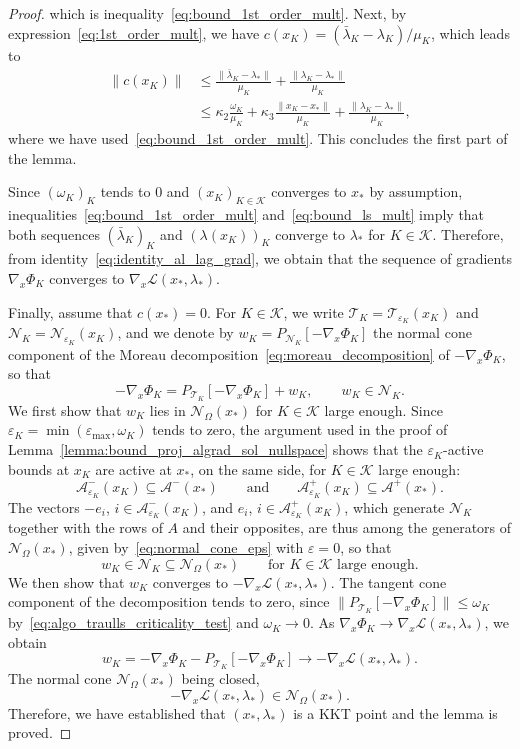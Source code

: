 \documentclass{article}
\numberwithin{equation}{section}
\newcommand{\calA}{{\mathcal{A}}}
\newcommand{\calL}{{\mathcal{L}}}
\newcommand{\calK}{{\mathcal{K}}}
\newcommand{\calN}{{\mathcal{N}}}
\newcommand{\calT}{{\mathcal{T}}}
\newcommand{\proj}[2]{P_{#1} \left[ {#2} \right]} %
\theoremstyle{plain}
\begin{document}
\begin{proof}
		which is inequality~\eqref{eq:bound_1st_order_mult}. 
		Next, by expression~\eqref{eq:1st_order_mult}, we have $c(x_K) = (\bar \lambda_K - \lambda_K) / \mu_K$, which leads to
		\begin{equation*}
			\begin{split}
				\|c(x_K) \| & \le \frac{\|\bar \lambda_K - \lambda_* \|}{\mu_K} + \frac{\|\lambda_K - \lambda_* \|}{\mu_K} \\
				& \le \kappa_2 \frac{\omega_K}{\mu_K} + \kappa_3 \frac{\|x_K-x_*\|}{\mu_K} + \frac{\|\lambda_K - \lambda_* \|}{\mu_K},
			\end{split}
		\end{equation*}
		where we have used~\eqref{eq:bound_1st_order_mult}.
		This concludes the first part of the lemma. 
	
		Since $(\omega_K)_K$ tends to $0$ and $(x_K)_{K\in \calK}$ converges to $x_*$ by assumption, inequalities~\eqref{eq:bound_1st_order_mult} and~\eqref{eq:bound_ls_mult} imply that both sequences $(\bar \lambda_K)_K$ and $(\lambda(x_K))_K$ converge to $\lambda_*$ for $K \in \calK$. Therefore, from identity~\eqref{eq:identity_al_lag_grad}, we obtain that the sequence of gradients $\nabla_x \Phi_K$ converges to $\nabla_x \calL(x_*,\lambda_*)$. 
	
	Finally, assume that $c(x_*) = 0$. For $K \in \calK$, we write $\calT_K = \calT_{\varepsilon_K}(x_K)$ and $\calN_K = \calN_{\varepsilon_K}(x_K)$, and we denote by $w_K = \proj{\calN_K}{-\nabla_x\Phi_K}$ the normal cone component of the Moreau decomposition~\eqref{eq:moreau_decomposition} of $-\nabla_x\Phi_K$, so that
	\[-\nabla_x\Phi_K = \proj{\calT_K}{-\nabla_x\Phi_K} + w_K, \qquad w_K \in \calN_K.\]
	We first show that $w_K$ lies in $\calN_\Omega(x_*)$ for $K \in \calK$ large enough. Since $\varepsilon_K = \min(\varepsilon_{\max},\omega_K)$ tends to zero, the argument used in the proof of Lemma~\ref{lemma:bound_proj_algrad_sol_nullspace} shows that the $\varepsilon_K$-active bounds at $x_K$ are active at $x_*$, on the same side, for $K \in \calK$ large enough:
	\[\calA^-_{\varepsilon_K}(x_K) \subseteq \calA^-(x_*) \qquad \text{and} \qquad \calA^+_{\varepsilon_K}(x_K) \subseteq \calA^+(x_*).\]
	The vectors $-e_i$, $i \in \calA^-_{\varepsilon_K}(x_K)$, and $e_i$, $i \in \calA^+_{\varepsilon_K}(x_K)$, which generate $\calN_K$ together with the rows of $A$ and their opposites, are thus among the generators of $\calN_\Omega(x_*)$, given by~\eqref{eq:normal_cone_eps} with $\varepsilon = 0$, so that
	\[w_K \in \calN_K \subseteq \calN_\Omega(x_*) \qquad \text{for } K \in \calK \text{ large enough}.\]
	We then show that $w_K$ converges to $-\nabla_x\calL(x_*,\lambda_*)$. The tangent cone component of the decomposition tends to zero, since $\|\proj{\calT_K}{-\nabla_x\Phi_K}\| \le \omega_K$ by~\eqref{eq:algo_traulls_criticality_test} and $\omega_K \to 0$. As $\nabla_x\Phi_K \to \nabla_x\calL(x_*,\lambda_*)$, we obtain
	\[w_K = -\nabla_x\Phi_K - \proj{\calT_K}{-\nabla_x\Phi_K} \to -\nabla_x\calL(x_*,\lambda_*).\]
	The normal cone $\calN_\Omega(x_*)$ being closed,
	\[-\nabla_x\calL(x_*,\lambda_*) \in \calN_\Omega(x_*).\]
	Therefore, we have established that $(x_*,\lambda_*)$ is a KKT point and the lemma is proved.
\end{proof}
\end{document}
